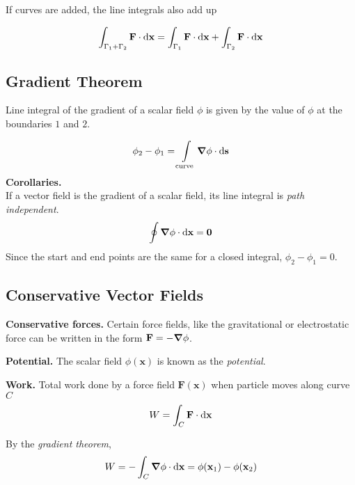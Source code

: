 If curves are added, the line integrals also add up

\begin{equation*}
    \int_{\Gamma_1 + \Gamma_2} \mathbf{F} \cdot \differential \mathbf{x} = \int_{\Gamma_1} \mathbf{F} \cdot \differential \mathbf{x} + \int_{\Gamma_2} \mathbf{F} \cdot \differential \mathbf{x}
\end{equation*}

\subsection*{Gradient Theorem}
Line integral of the gradient of a scalar field $\phi$ is given by the value of $\phi$ at the boundaries $1$ and $2$.

\begin{equation*}
    \phi_2 - \phi_1 = \int\limits_{\mathrm{curve}} \grad \phi \cdot \differential \mathbf{s}
\end{equation*}
\textbf{Corollaries.} \\
If a vector field is the gradient of a scalar field, its line integral is \textit{path independent}.
\begin{equation*}
    \oint \grad \phi \cdot \differential \bf{x} = 0
\end{equation*}
Since the start and end points are the same for a closed integral, $\phi_2 - \phi_1 = 0$.

\subsection*{Conservative Vector Fields}

 \textbf{Conservative forces.} Certain force fields, like the gravitational or electrostatic force can be written in the form $\mathbf{F} = -\grad \phi$.
 
 \textbf{Potential.} The scalar field $\phi(\mathbf{x})$ is known as the \textit{potential}.

 \textbf{Work.} Total work done by a force field $\mathbf{F}(\mathbf{x})$ when particle moves along curve $C$
 \begin{equation*}
    W = \int_{C} \bf{F} \cdot \differential \bf{x}
 \end{equation*}

By the \textit{gradient theorem},
 \begin{equation*}
    W = - \int_{C} \bf{\grad \phi} \cdot \differential \bf{x} = \phi(\mathbf{x}_{\mathrm{1}}) - \phi(\mathbf{x}_{\mathrm{2}})
 \end{equation*}

